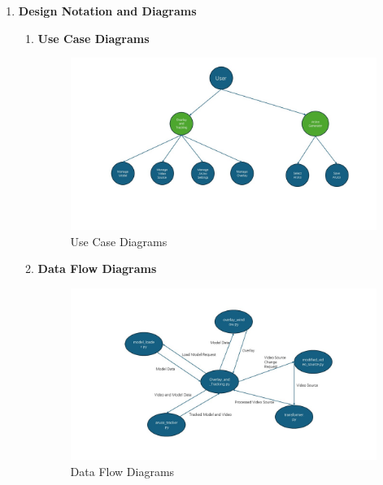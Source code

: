 \documentclass[12pt]{article}
\begin{document}
\begin{enumerate}
      \item \textbf{Design Notation and Diagrams}
            \begin{enumerate}
                  \item \textbf{Use Case Diagrams}
                        \begin{figure}[H]
                              \centering
                              \includegraphics[width=1.1\textwidth]{case.jpg}
                              \caption{Use Case Diagrams}
                        \end{figure}
                  \item \textbf{Data Flow Diagrams}
                        \begin{figure}[H]
                              \centering
                              \includegraphics[width=1.1\textwidth]{data.jpg}
                              \caption{Data Flow Diagrams}
                        \end{figure}
            \end{enumerate}
\end{enumerate}
\end{document}
